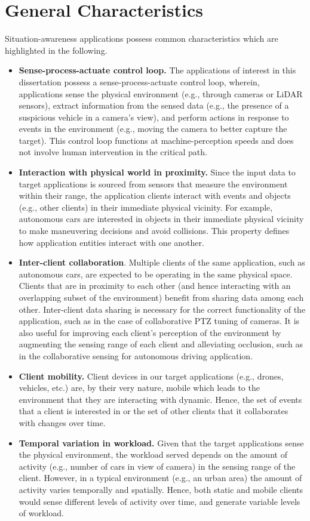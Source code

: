 \section{General Characteristics}
Situation-awareness applications possess common characteristics which are highlighted in the following.
\begin{itemize}
\item \textbf{Sense-process-actuate control loop. }  The applications of interest in this dissertation possess a sense-process-actuate control loop, wherein, applications sense the physical environment (e.g., through cameras or LiDAR sensors), extract information from the sensed data (e.g., the presence of a suspicious vehicle in a camera's view), and perform actions in response to events in the environment (e.g., moving the camera to better capture the target). This control loop functions at machine-perception speeds and does not involve human intervention in the critical path.
\item \textbf{Interaction with physical world in proximity. } Since the input data to target applications is sourced from sensors that measure the environment within their range, the application clients interact with events and objects (e.g., other clients) in their immediate physical vicinity. For example, autonomous cars are interested in objects in their immediate physical vicinity to make maneuvering decisions and avoid collisions. This property defines how application entities interact with one another.
\item \textbf{Inter-client collaboration}. Multiple clients of the same application, such as autonomous cars, are expected to be operating in the same physical space. Clients that are in proximity to each other (and hence interacting with an overlapping subset of the environment) benefit from sharing data among each other. Inter-client data sharing is necessary for the correct functionality of the application, such as in the case of collaborative PTZ tuning of cameras. It is also useful for improving each client's perception of the environment by augmenting the sensing range of each client and alleviating occlusion, such as in the collaborative sensing for autonomous driving application. 
\item \textbf{Client mobility.} Client devices in our target applications (e.g., drones, vehicles, etc.) are, by their very nature, mobile which leads to the environment that they are interacting with dynamic. Hence, the set of events that a client is interested in or the set of other clients that it collaborates with changes over time.
\item \textbf{Temporal variation in workload.} Given that the target applications sense the physical environment, the workload served depends on the amount of activity (e.g., number of cars in view of camera) in the sensing range of the client. However, in a typical environment (e.g., an urban area) the amount of activity varies temporally and spatially. Hence, both static and mobile clients would sense different levels of activity over time, and generate variable levels of workload.
\end{itemize}
